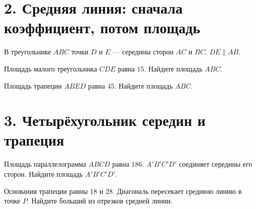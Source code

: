 
\section*{2. Средняя линия: сначала коэффициент, потом площадь}

\begin{minipage}[t]{.55\linewidth}
В треугольнике \(ABC\) точки \(D\) и \(E\) --- середины сторон \(AC\) и \(BC\).
\(DE\parallel AB\).

\ex Площадь малого треугольника \(CDE\) равна \(15\). Найдите площадь \(ABC\).

\ex Площадь трапеции \(ABED\) равна \(45\). Найдите площадь \(ABC\).
\end{minipage}\hfill
\begin{minipage}[t]{.4\linewidth}\centering
\figMidlineTriangle
\end{minipage}


\newpage
\section*{3. Четырёхугольник середин и трапеция}

\begin{minipage}[t]{.49\linewidth}
\centering\figParallelogramMidpoints

\raggedright
\ex Площадь параллелограмма \(ABCD\) равна \(186\). \(A'B'C'D'\) соединяет
середины его сторон. Найдите площадь \(A'B'C'D'\).
\end{minipage}\hfill
\begin{minipage}[t]{.49\linewidth}
\centering\figTrapezoidDiagonal

\raggedright
\ex Основания трапеции равны \(18\) и \(28\). Диагональ пересекает среднюю
линию в точке \(P\). Найдите больший из отрезков средней линии.
\end{minipage}

